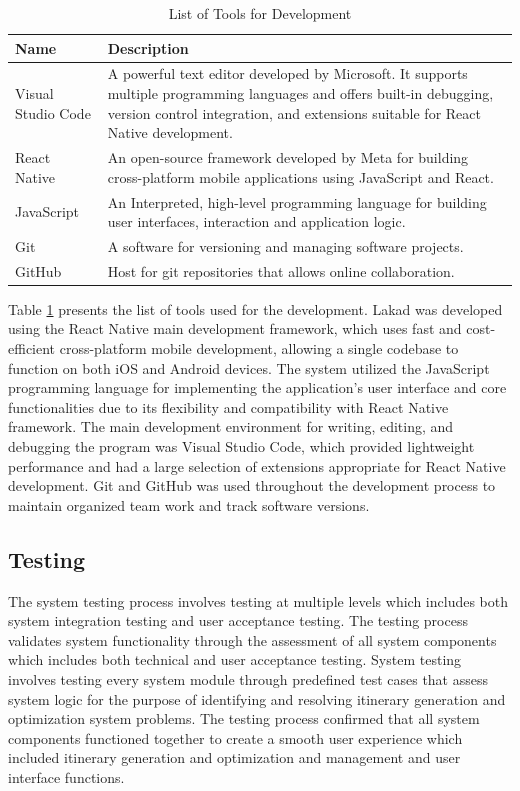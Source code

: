 \begin{table}[H]
	\centering
	\singlespacing
	\caption{List of Tools for Development}
	\label{listtools}
	\renewcommand{\arraystretch}{1.2}
	\begin{tabularx}{\linewidth}{p{}X}
		\toprule 
		\textbf{Name} & \textbf{Description} \\
		\midrule
		Visual Studio Code  & A powerful text editor developed by Microsoft. It supports multiple programming languages and offers built-in debugging, version control integration, and extensions suitable for React Native development. \\
		React Native        & An open-source framework developed by Meta for building cross-platform mobile applications using JavaScript and React. \\
		JavaScript     & An Interpreted, high-level programming language for building user interfaces, interaction and application logic.\\
		Git                 & A software for versioning and managing software projects. \\
		GitHub              & Host for git repositories that allows online collaboration. \\
		\bottomrule
	\end{tabularx}
\end{table}

Table \ref{listtools} presents the list of tools used for the development. Lakad was developed using the React Native main development framework, which uses fast and cost-efficient cross-platform mobile development, allowing a single codebase to function on both iOS and Android devices. The system utilized the JavaScript programming language for implementing the application’s user interface and core functionalities due to its flexibility and compatibility with React Native framework. The main development environment for writing, editing, and debugging the program was Visual Studio Code, which provided lightweight performance and had a large selection of extensions appropriate for React Native development. Git and GitHub was used throughout the development process to maintain organized team work and track software versions.


\subsection{Testing}
The system testing process involves testing at multiple levels which includes both system integration testing and user acceptance testing. The testing process validates system functionality through the assessment of all system components which includes both technical and user acceptance testing. System testing involves testing every system module through predefined test cases that assess system logic for the purpose of identifying and resolving itinerary generation and optimization system problems. The testing process confirmed that all system components functioned together to create a smooth user experience which included itinerary generation and optimization and management and user interface functions.

